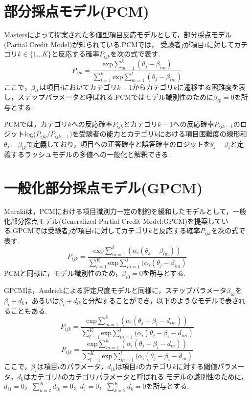\documentclass[a4paper,11pt,oneside,openany]{jsbook}
\begin{document}
\section{部分採点モデル(PCM)}
Mastersによって提案された多値型項目反応モデルとして，部分採点モデル(Partial Credit Model)\cite{PCM}が知られている.PCMでは， 受験者$j$が項目$i$に対してカテゴリ$k \in \{1\dots K\}$と反応する確率$P_{ijk}$を次の式で表す.
\begin{displaymath}
P_{ijk} = \frac{\mathrm{exp}\sum_{m=1}^{k}(\theta_{j}-\beta_{im})}{\sum_{l=1}^{k} \mathrm{exp}\sum_{m=1}^{l}(\theta_{j}-\beta_{im})}
\end{displaymath}
ここで，$\beta_{ik}$は項目$i$においてカテゴリ$k-1$からカテゴリ$k$に遷移する困難度を表し，ステップパラメータと呼ばれる.PCMではモデル識別性のために$\beta_{i0}=0$を所与とする.

PCMでは，カテゴリ$k$への反応確率$P_{ijk}$とカテゴリ$k-1$への反応確率$P_{ijk-1}$のロジットlog($P_{ijk}/P_{ijk-1}$)を受験者の能力とカテゴリ$k$における項目困難度の線形和$\theta_{j}-\beta_{ik}$で定義しており，項目への正答確率と誤答確率のロジットを$\theta_{j}-\beta_{i}$と定義するラッシュモデルの多値への一般化と解釈できる.

\section{一般化部分採点モデル(GPCM)}
Murakiは，PCMにおける項目識別力一定の制約を緩和したモデルとして，一般化部分採点モデル(Generalized Partial Credit Model:GPCM)\cite{GPCM}を提案している.GPCMでは受験者$j$が項目$i$に対してカテゴリ$k$と反応する確率$P_{ijk}$を次の式で表す.
\begin{displaymath}
P_{ijk} = \frac{\mathrm{exp}\sum_{m=1}^{k}(\alpha_{i}(\theta_{j}-\beta_{im}))}{\sum_{l=1}^{K} \mathrm{exp}\sum_{m=1}^{l}(\alpha_{i}(\theta_{j}-\beta_{im})}
\end{displaymath}
PCMと同様に，モデル識別性のため，$\beta_{i0}=0$を所与とする.

GPCMは，Andrichによる評定尺度モデル\cite{RSM}と同様に，ステップパラメータ$\beta_{ik}$を$\beta_{i}+d_{k}$，あるいは$\beta_{i}+d_{ik}$と分解することができ，以下のようなモデルで表されることもある.
\begin{displaymath}
P_{ijk} = \frac{\mathrm{exp}\sum_{m=1}^{k}(\alpha_{i}(\theta_{j}-\beta_{i}-d_{im}))}{\sum_{l=1}^{K} \mathrm{exp}\sum_{m=1}^{l}(\alpha_{i}(\theta_{j}-\beta_{i}-d_{im})}
\end{displaymath}
\begin{displaymath}
P_{ijk} = \frac{\mathrm{exp}\sum_{m=1}^{k}(\alpha_{i}(\theta_{j}-\beta_{i}-d_{m}))}{\sum_{l=1}^{K} \mathrm{exp}\sum_{m=1}^{l}(\alpha_{i}(\theta_{j}-\beta_{i}-d_{m})}
\end{displaymath}
ここで，$\beta_{i}$は項目$i$のパラメータ，$d_{ik}$は項目$i$のカテゴリ$k$に対する閾値パラメータ，$d_k$はカテゴリ$k$のカテゴリパラメータと呼ばれる.モデルの識別性のために，$d_{i1}=0，\sum_{k=2}^{K}d_{ik}=0，d_1=0，\sum_{k=2}^{K}d_{k}=0$を所与とする.
\end{document}
